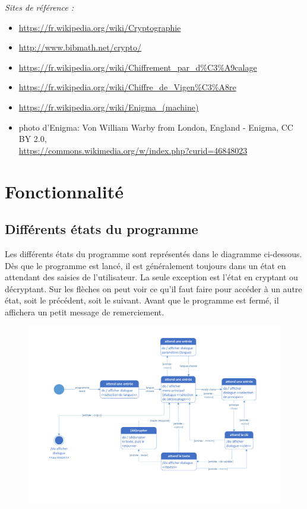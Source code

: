 \documentclass[a4paper,12pt,abstracton,titlepage]{scrartcl}
\begin{document}
\textit{Sites de référence :}
\begin{itemize}
\item \url{https://fr.wikipedia.org/wiki/Cryptographie}
\item \url{http://www.bibmath.net/crypto/}
\item \url{https://fr.wikipedia.org/wiki/Chiffrement_par_d\%C3\%A9calage}
\item \url{https://fr.wikipedia.org/wiki/Chiffre_de_Vigen\%C3\%A8re}
\item \url{https://fr.wikipedia.org/wiki/Enigma_(machine)}
\item photo d’Enigma:
Von William Warby from London, England - Enigma, CC BY 2.0,\\\url{https://commons.wikimedia.org/w/index.php?curid=46848023}\\
\end{itemize}



\newpage
\section{Fonctionnalité}
\subsection{Différents états du programme}
Les différents états du programme sont représentés dans le diagramme ci-dessous. Dès que le programme est lancé, il est généralement toujours dans un état en attendant des saisies de l'utilisateur. La seule exception est l'état en cryptant ou décryptant.
Sur les flèches on peut voir ce qu'il faut faire pour accéder à un autre état, soit le précédent, soit le suivant.
Avant que le programme est fermé, il affichera un petit message de remerciement.\\

\begin{figure}[tpbh]
	\centering
  \includegraphics[width=\textwidth, trim=20mm 38mm 25mm 13mm, clip]{./Diagrammes/diagrammeDesEtats.pdf}
	\label{img:etats}
\end{figure}
\end{document}
